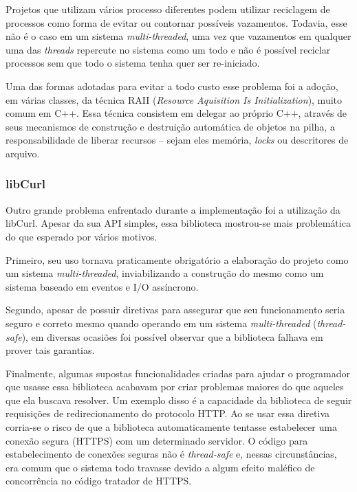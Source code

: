\documentclass[10pt,twocolumn]{article}
\begin{document}
Projetos que utilizam vários processo diferentes podem
utilizar reciclagem de processos como forma de evitar ou contornar
possíveis vazamentos. Todavia, esse não é o caso em  um sistema
\emph{multi-threaded}, uma vez que vazamentos em qualquer uma das
\emph{threads} repercute no sistema como um todo e não é possível
reciclar processos sem que todo o sistema tenha quer ser re-iniciado.

Uma das formas adotadas para evitar a todo custo esse problema foi a
adoção, em várias classes, da técnica RAII (\emph{Resource Aquisition
Is Initialization}), muito comum em C++. Essa técnica consistem em
delegar ao próprio C++, através de seus mecanismos de construção e
destruição automática de objetos na pilha, a responsabilidade de liberar
recursos -- sejam eles memória, \emph{locks} ou descritores de arquivo.

\subsubsection{libCurl}

Outro grande problema enfrentado durante a implementação foi a
utilização da libCurl. Apesar da sua API simples, essa biblioteca
mostrou-se mais problemática do que esperado por vários motivos.

Primeiro, seu uso tornava praticamente obrigatório a elaboração do
projeto como um sistema \emph{multi-threaded}, inviabilizando a construção do
mesmo como um sistema baseado em eventos e I/O assíncrono.

Segundo, apesar de possuir diretivas para assegurar que seu
funcionamento seria seguro e correto mesmo quando operando em um sistema
\emph{multi-threaded} (\emph{thread-safe}), em diversas ocasiões foi
possível observar que a biblioteca falhava em prover tais garantias.

Finalmente, algumas supostas funcionalidades criadas para ajudar o
programador que usasse essa biblioteca acabavam por criar problemas
maiores do que aqueles que ela buscava resolver. Um exemplo disso é a
capacidade da biblioteca de seguir requisições de redirecionamento do protocolo
HTTP. Ao se usar essa diretiva corria-se o risco de que a biblioteca
automaticamente tentasse estabelecer uma conexão segura (HTTPS) com um
determinado servidor. O código para estabelecimento de conexões seguras
não é \emph{thread-safe} e, nessas circunstâncias, era comum que o
sistema todo travasse devido a algum efeito maléfico de concorrência no
código tratador de HTTPS.
\end{document}
